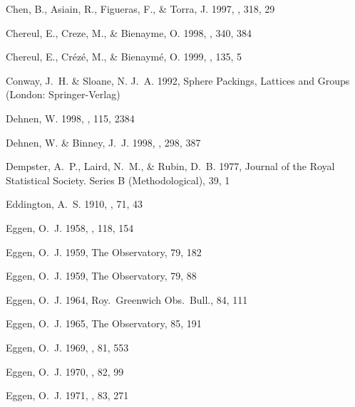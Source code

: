 \begin{thebibliography}{99}
{Chen}, B., {Asiain}, R., {Figueras}, F., \& {Torra}, J. 1997, \aap, 318, 29

{Chereul}, E., {Creze}, M., \& {Bienayme}, O. 1998, \aap, 340, 384

{Chereul}, E., {Cr{\'e}z{\'e}}, M., \& {Bienaym{\'e}}, O. 1999, \aaps, 135, 5

{Conway}, J.~H. \& {Sloane}, N. J.~A. 1992, {Sphere Packings, Lattices and
  Groups} (London: {Springer-Verlag})

{Dehnen}, W. 1998, \aj, 115, 2384

{Dehnen}, W. \& {Binney}, J.~J. 1998, \mnras, 298, 387

{Dempster}, A.~P., {Laird}, N.~M., \& {Rubin}, D.~B. 1977, Journal of the Royal
  Statistical Society. Series B (Methodological), 39, 1

{Eddington}, A.~S. 1910, \mnras, 71, 43

{Eggen}, O.~J. 1958, \mnras, 118, 154

{Eggen}, O.~J. 1959{}, The Observatory, 79, 182

{Eggen}, O.~J. 1959{}, The Observatory, 79, 88

{Eggen}, O.~J. 1964, Roy.~Greenwich Obs.~Bull., 84, 111

{Eggen}, O.~J. 1965, The Observatory, 85, 191

{Eggen}, O.~J. 1969, \pasp, 81, 553

{Eggen}, O.~J. 1970, \pasp, 82, 99

{Eggen}, O.~J. 1971{}, \pasp, 83, 271


\end{thebibliography}
